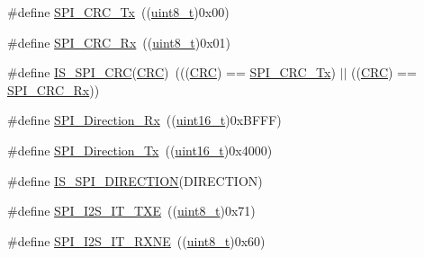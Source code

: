 \begin{DoxyCompactItemize}
\item 
\#define \hyperlink{group___s_p_i___c_r_c___transmit___receive_ga7b5cd97c9323e491b628fd3a7be9e133}{S\+P\+I\+\_\+\+C\+R\+C\+\_\+\+Tx}~((\hyperlink{_p_e___types_8h_aba7bc1797add20fe3efdf37ced1182c5}{uint8\+\_\+t})0x00)
\item 
\#define \hyperlink{group___s_p_i___c_r_c___transmit___receive_gaf68380273616efbbc2dc9a420f1c641b}{S\+P\+I\+\_\+\+C\+R\+C\+\_\+\+Rx}~((\hyperlink{_p_e___types_8h_aba7bc1797add20fe3efdf37ced1182c5}{uint8\+\_\+t})0x01)
\item 
\#define \hyperlink{group___s_p_i___c_r_c___transmit___receive_ga31fe242594f851558496a93f85def883}{I\+S\+\_\+\+S\+P\+I\+\_\+\+C\+RC}(\hyperlink{group___peripheral__declaration_ga4381bb54c2dbc34500521165aa7b89b1}{C\+RC})~(((\hyperlink{group___peripheral__declaration_ga4381bb54c2dbc34500521165aa7b89b1}{C\+RC}) == \hyperlink{openmotestm_2library_2inc_2stm32f10x__spi_8h_a7b5cd97c9323e491b628fd3a7be9e133}{S\+P\+I\+\_\+\+C\+R\+C\+\_\+\+Tx}) $\vert$$\vert$ ((\hyperlink{group___peripheral__declaration_ga4381bb54c2dbc34500521165aa7b89b1}{C\+RC}) == \hyperlink{openmotestm_2library_2inc_2stm32f10x__spi_8h_af68380273616efbbc2dc9a420f1c641b}{S\+P\+I\+\_\+\+C\+R\+C\+\_\+\+Rx}))
\item 
\#define \hyperlink{group___s_p_i__direction__transmit__receive_ga9a59d225a8cf42eebafbec6ad95c078c}{S\+P\+I\+\_\+\+Direction\+\_\+\+Rx}~((\hyperlink{_p_e___types_8h_a1f1825b69244eb3ad2c7165ddc99c956}{uint16\+\_\+t})0x\+B\+F\+F\+F)
\item 
\#define \hyperlink{group___s_p_i__direction__transmit__receive_gabd76982a7e305c13f7ad8ea1789d3c0c}{S\+P\+I\+\_\+\+Direction\+\_\+\+Tx}~((\hyperlink{_p_e___types_8h_a1f1825b69244eb3ad2c7165ddc99c956}{uint16\+\_\+t})0x4000)
\item 
\#define \hyperlink{group___s_p_i__direction__transmit__receive_gae96b69403c4206e347cde77b9a30e207}{I\+S\+\_\+\+S\+P\+I\+\_\+\+D\+I\+R\+E\+C\+T\+I\+ON}(D\+I\+R\+E\+C\+T\+I\+ON)
\item 
\#define \hyperlink{group___s_p_i___i2_s__interrupts__definition_ga0f192977fdb12c40d35672b8ae074724}{S\+P\+I\+\_\+\+I2\+S\+\_\+\+I\+T\+\_\+\+T\+XE}~((\hyperlink{_p_e___types_8h_aba7bc1797add20fe3efdf37ced1182c5}{uint8\+\_\+t})0x71)
\item 
\#define \hyperlink{group___s_p_i___i2_s__interrupts__definition_gae46dd53cd2e4ad8b8a7836d3dcec57ea}{S\+P\+I\+\_\+\+I2\+S\+\_\+\+I\+T\+\_\+\+R\+X\+NE}~((\hyperlink{_p_e___types_8h_aba7bc1797add20fe3efdf37ced1182c5}{uint8\+\_\+t})0x60)
\item 
$$
\end{DoxyCompactItemize}
